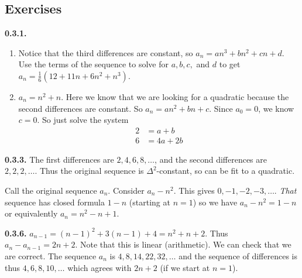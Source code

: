 \documentclass[12pt,]{book}
\theoremstyle{plain}
\theoremstyle{definition}
\theoremstyle{definition}
\theoremstyle{definition}
\numberwithin{equation}{chapter}
\newcommand{\amp}{&}
\begin{document}
\subsection*{ Exercises}
\noindent\textbf{0.3.1.} \hypertarget{p-258}{}%
\leavevmode%
\begin{enumerate}[label=(\alph*)]
\item\hypertarget{li-165}{}\hypertarget{p-259}{}%
Notice that the third differences are constant, so \(a_n = an^3 + bn^2 + cn + d\). Use the terms of the sequence to solve for \(a, b, c,\) and \(d\) to get \(a_n = \frac{1}{6} (12+11 n+6 n^2+n^3)\).%
\item\hypertarget{li-166}{}\(a_n = n^2 + n\).  Here we know that we are looking for a quadratic because the second differences are constant.  So \(a_n = an^2 + bn + c\).  Since \(a_0 = 0\), we know \(c= 0\).  So just solve the system%
\begin{align*}
2 \amp = a + b \\
6 \amp = 4a + 2b 
\end{align*}
%
\end{enumerate}
%
\par\smallskip
\noindent\textbf{0.3.3.} \hypertarget{p-262}{}%
The first differences are \(2, 4, 6, 8, \ldots\), and the second differences are \(2, 2, 2, \ldots\). Thus the original sequence is \(\Delta^2\)-constant, so can be fit to a quadratic.%
\par
\hypertarget{p-263}{}%
Call the original sequence \(a_n\). Consider \(a_n - n^2\). This gives \(0, -1, -2, -3, \ldots\). \emph{That} sequence has closed formula \(1-n\) (starting at \(n = 1\)) so we have \(a_n - n^2 = 1-n\) or equivalently \(a_n = n^2 - n + 1\).%
\par\smallskip
\noindent\textbf{0.3.6.} \hypertarget{p-273}{}%
\(a_{n-1} = (n-1)^2 + 3(n-1) + 4 = n^2 + n + 2\). Thus \(a_n - a_{n-1} = 2n+2\). Note that this is linear (arithmetic). We can check that we are correct. The sequence \(a_n\) is \(4, 8, 14, 22, 32, \ldots\) and the sequence of differences is thus \(4, 6, 8, 10,\ldots\) which agrees with \(2n+2\) (if we start at \(n = 1\)).%
\par\smallskip
\end{document}
